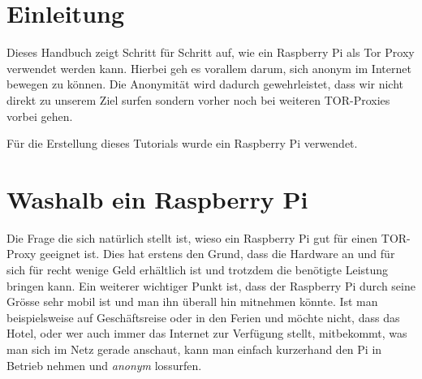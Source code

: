 \section{Einleitung}
Dieses Handbuch zeigt Schritt für Schritt auf, wie ein Raspberry Pi als Tor Proxy verwendet werden kann. Hierbei geh es vorallem darum, sich anonym im Internet bewegen zu können. Die Anonymität wird dadurch gewehrleistet, dass wir nicht direkt zu unserem Ziel surfen sondern vorher noch bei weiteren TOR-Proxies vorbei gehen. 

Für die Erstellung dieses Tutorials wurde ein Raspberry Pi verwendet. 



\section{Washalb ein Raspberry Pi}
Die Frage die sich natürlich stellt ist, wieso ein Raspberry Pi gut für einen TOR-Proxy geeignet ist. Dies hat erstens den Grund, dass die Hardware an und für sich für recht wenige Geld erhältlich ist und trotzdem die benötigte Leistung bringen kann. Ein weiterer wichtiger Punkt ist, dass der Raspberry Pi durch seine Grösse sehr mobil ist und man ihn überall hin mitnehmen könnte. Ist man beispielsweise auf Geschäftsreise oder in den Ferien und möchte nicht, dass das Hotel, oder wer auch immer das Internet zur Verfügung stellt, mitbekommt, was man sich im Netz gerade anschaut, kann man einfach kurzerhand den Pi in Betrieb nehmen und \textit{anonym} lossurfen.
